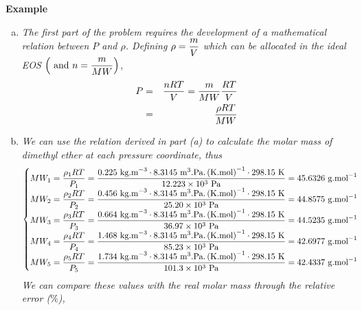 \begin{MyExample}{\begin{center}{\bf Example}\end{center}}
\begin{example}
       \begin{enumerate}[a)]
           \item {\it The first part of the problem requires the development of a mathematical relation between $P$ and $\rho$. Defining} $\rho=\displaystyle\frac{m}{V}$ {\it which can be allocated in the ideal EOS} $\left(\text{ and }n=\displaystyle\frac{m}{MW}\right)$,
              \begin{eqnarray}
                 P &=& \displaystyle\frac{n R T }{V} = \displaystyle\frac{m}{MW}\displaystyle\frac{R T}{V} \\ 
                   &=& \displaystyle\frac{\rho R T}{MW}
              \end{eqnarray}
%
           \item {\it We can use the relation derived in part (a) to calculate the molar mass of dimethyl ether at each pressure coordinate, thus}
              \begin{displaymath}
                  \begin{cases}
                     MW_{1} = \displaystyle\frac{\rho_{1} R T}{P_{1}} = \displaystyle\frac{0.225\text{ kg.m}^{-3}\cdot 8.3145\text{ m}^{3}\text{.Pa.}\left(\text{K.mol}\right)^{-1}\cdot 298.15\text{ K}}{12.223\times 10^{3}\text{ Pa}} = 45.6326 \text{ g.mol}^{-1} \\
                     MW_{2} = \displaystyle\frac{\rho_{2} R T}{P_{2}} = \displaystyle\frac{0.456\text{ kg.m}^{-3}\cdot 8.3145\text{ m}^{3}\text{.Pa.}\left(\text{K.mol}\right)^{-1}\cdot 298.15\text{ K}}{25.20\times 10^{3}\text{ Pa}} = 44.8575 \text{ g.mol}^{-1} \\
                     MW_{3} = \displaystyle\frac{\rho_{3} R T}{P_{3}} = \displaystyle\frac{0.664\text{ kg.m}^{-3}\cdot 8.3145\text{ m}^{3}\text{.Pa.}\left(\text{K.mol}\right)^{-1}\cdot 298.15\text{ K}}{36.97\times 10^{3}\text{ Pa}} = 44.5235 \text{ g.mol}^{-1} \\
                     MW_{4} = \displaystyle\frac{\rho_{4} R T}{P_{4}} = \displaystyle\frac{1.468\text{ kg.m}^{-3}\cdot 8.3145\text{ m}^{3}\text{.Pa.}\left(\text{K.mol}\right)^{-1}\cdot 298.15\text{ K}}{85.23\times 10^{3}\text{ Pa}} = 42.6977 \text{ g.mol}^{-1} \\
                     MW_{5} = \displaystyle\frac{\rho_{5} R T}{P_{5}} = \displaystyle\frac{1.734\text{ kg.m}^{-3}\cdot 8.3145\text{ m}^{3}\text{.Pa.}\left(\text{K.mol}\right)^{-1}\cdot 298.15\text{ K}}{101.3\times 10^{3}\text{ Pa}} = 42.4337 \text{ g.mol}^{-1} \\
                  \end{cases} 
              \end{displaymath}
              {\it We can compare these values with the real molar mass through the relative error ($\%$),}

\end{enumerate}
\end{example}
\end{MyExample}
